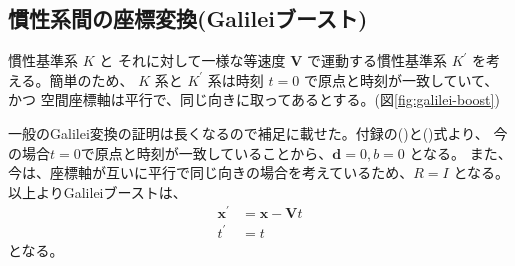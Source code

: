 \documentclass[a4paper,11pt]{ltjsarticle}
\begin{document}
\subsection{慣性系間の座標変換(Galileiブースト)}
\label{sec:Galilei Boost}
慣性基準系 $K$ と それに対して一様な等速度 $\bm{V}$ で運動する慣性基準系 $K^\prime$
を考える。簡単のため、 $K$ 系と $K^\prime$ 系は時刻 $t=0$ で原点と時刻が一致していて、かつ
空間座標軸は平行で、同じ向きに取ってあるとする。(図\ref{fig:galilei-boost})

一般のGalilei変換の証明は長くなるので補足に載せた。付録の()と()式より、
今の場合$t=0$で原点と時刻が一致していることから、$\bm{d}=0 , b=0$ となる。
また、今は、座標軸が互いに平行で同じ向きの場合を考えているため、$R=I$ となる。
\\以上よりGalileiブーストは、
\begin{align}
\bm{x}^\prime&=\bm{x}-\bm{V}t
\label{eq:Galilei Trans}
\\t^\prime&=t
\label{eq:Galilei Trans2}
\end{align}
となる。
\end{document}

